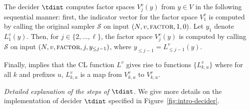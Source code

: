 \documentclass[11pt]{article}
\theoremstyle{definition}
\newcommand{\sampler}{\mathcal{S}}
\newcommand{\gamestyle}[1]{\ensuremath{\textsc{#1}}\xspace}
\newcommand{\trole}{\ensuremath{v}}
\begin{document}
The decider $\tdint$ computes factor spaces $V_j^\trole(y)$ from $y \in
V$ in the following sequential manner: first, the indicator vector for the
factor space $V^\trole_1$ is computed by calling the original sampler $\sampler$
on input $(N,\trole,\gamestyle{factor},1,0)$.
Let $y_1$ denote $L_1^\trole(y)$.
Then, for $j \in \{2,\ldots,\ell\}$, the factor space $V^\trole_j(y)$ is
computed by calling $\sampler$ on input $(N,\trole,\gamestyle{factor},j,y_{\le
  j-1})$, where $y_{\le j-1} = L^\trole_{\leq j-1}(y)$.

Finally,  implies that the CL function $L^\trole$ gives rise to functions $\{ L_{k,u}^\trole \}$ where for all $k$ and prefixes $u$, $L_{k,u}^\trole$ is a map from $V_{k,u}^\trole$ to $V_{k,u}^\trole$.

\medskip
\emph{Detailed explanation of the steps of $\tdint$.}
We give more details on the implementation of decider $\tdint$
specified in Figure~\ref{fig:intro-decider}.
\end{document}
